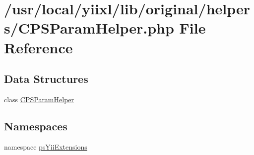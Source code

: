 \hypertarget{CPSParamHelper_8php}{
\section{/usr/local/yiixl/lib/original/helpers/CPSParamHelper.php File Reference}
\label{CPSParamHelper_8php}
}
\subsection*{Data Structures}
\begin{DoxyCompactItemize}
\item 
class \hyperlink{classCPSParamHelper}{CPSParamHelper}
\end{DoxyCompactItemize}
\subsection*{Namespaces}
\begin{DoxyCompactItemize}
\item 
namespace \hyperlink{namespacepsYiiExtensions}{psYiiExtensions}
\end{DoxyCompactItemize}
